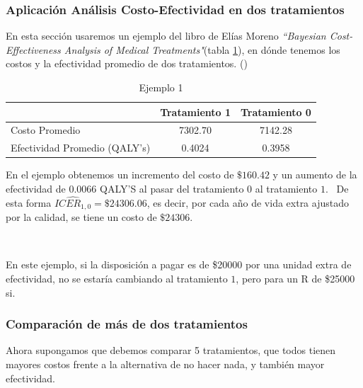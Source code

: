 \documentclass[12pt]{article}
\begin{document}
\newpage

 


    

\subsubsection{Aplicación Análisis Costo-Efectividad en dos tratamientos}

En esta sección usaremos un ejemplo del libro de Elías Moreno \textit{``Bayesian Cost-Effectiveness Analysis of Medical Treatments"}(tabla \ref{tabla:1}), en dónde tenemos los costos y la efectividad promedio de dos tratamientos. (\cite{moreno_bayesian_nodate})

\begin{table}[ht]
\centering
\begin{tabular}{lcc}
  \hline
 & Tratamiento 1 & Tratamiento 0 \\ 
  \hline
Costo Promedio & 7302.70 & 7142.28 \\ 
  Efectividad Promedio (QALY's) & 0.4024 & 0.3958 \\ 
 \hline
\end{tabular}
\caption{Ejemplo 1}
\label{tabla:1}
\end{table}

En el ejemplo obtenemos un incremento del costo de $\$160.42$ y un aumento de la efectividad de $0.0066$ QALY'S al pasar del tratamiento $0$ al tratamiento $1$.
\
De esta forma $\widehat{ICER_{1,0}} = \$24306.06$, es decir, por cada año de vida extra ajustado por la calidad, se tiene un costo de $\$24306$.

\

En este ejemplo, si la disposición a pagar es de \$20000 por una unidad extra de efectividad, no se estaría cambiando al tratamiento $1$, pero para un R de \$25000 si.

\subsubsection{Comparación de más de dos tratamientos}

Ahora supongamos que debemos comparar 5 tratamientos, que todos tienen mayores costos frente a la alternativa de no hacer nada, y también mayor efectividad.\
\end{document}
